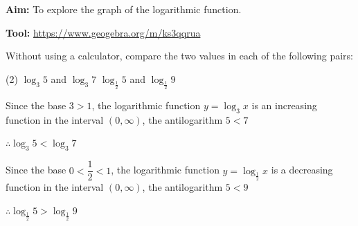 \documentclass{report}
\begin{document}
\begin{explore}
	            
	\textbf{Aim:} To explore the graph of the logarithmic function.
	            
	\textbf{Tool:} \url{https://www.geogebra.org/m/ks3qqrua}
\end{explore}

\begin{question}
	Without using a calculator, compare the two values in each of the following pairs:
	\begin{tasks}[label=(\alph*)](2)
		\task $\log _3 5$ and $\log _3 7$
		\task $\log _{\frac{1}{2}} 5$ and $\log _{\frac{1}{2}} 9$
	\end{tasks}
	
	\sol{}
	\begin{tasks}[label=(\alph*)]
		\task Since the base $3 > 1$, the logarithmic function $y=\log_3 x$ is an increasing function in the interval $(0, \infty)$, the antilogarithm $5<7$
		
		$\therefore \log _3 5<\log _3 7$
		
		\task Since the base $0<\dfrac{1}{2}<1$, the logarithmic function $y=\log_{\frac{1}{2}} x$ is a decreasing function in the interval $(0, \infty)$, the antilogarithm $5<9$
		
		$\therefore \log _{\frac{1}{2}} 5>\log _{\frac{1}{2}} 9$
	\end{tasks}
\end{question}
\end{document}
